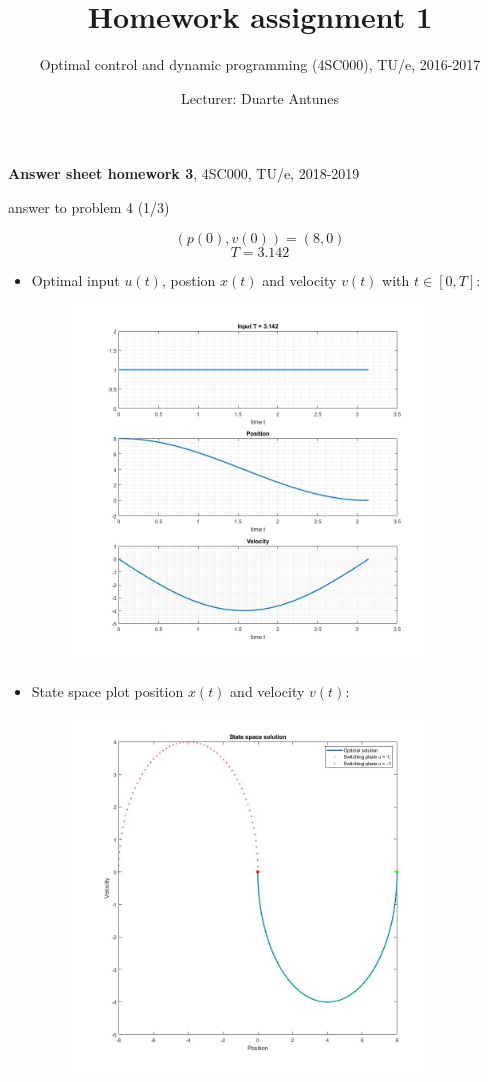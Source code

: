 \documentclass[a4paper]{article}
\title{Homework assignment 1}
\date{Lecturer: Duarte Antunes}
\author{Optimal control and dynamic programming (4SC000), TU/e, 2016-2017}
\begin{document}
	\thispagestyle{empty}
	\noindent	\hrulefill
	
	\textbf{Answer sheet homework 3}, 4SC000, TU/e, 2018-2019
	\begin{flushright}
		answer to problem 4 (1/3)
	\end{flushright}
	\noindent	\hrulefill
	$$(p(0),v(0))=(8,0)$$
				$$T=3.142$$
	\begin{itemize}
		\item[] Optimal input $u(t)$, postion $x(t)$ and velocity $v(t)$ with $t \in [0,T]$:
		\begin{figure}[h!]
			\centering
			\includegraphics[width=9.5cm]{Solution_init1}
		\end{figure}
		\item[] State space plot position $x(t)$ and velocity $v(t)$:
		\begin{figure}[h!]
			\centering
			\includegraphics[width=9.5cm]{Statespace_init1}
		\end{figure}
	\end{itemize}
				
\end{document}
